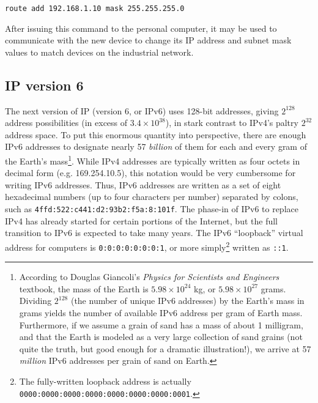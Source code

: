 \vskip 10pt

\texttt{route add 192.168.1.10 mask 255.255.255.0}

\vskip 10pt

After issuing this command to the personal computer, it may be used to communicate with the new device to change its IP address and subnet mask values to match devices on the industrial network.









\filbreak
\subsection{IP version 6}

The next version of IP (version 6, or IPv6) uses 128-bit addresses, giving $2^{128}$ address possibilities (in excess of $3.4 \times 10^{38}$), in stark contrast to IPv4's paltry $2^{32}$ address space.  To put this enormous quantity into perspective, there are enough IPv6 addresses to designate nearly 57 \textit{billion} of them for each and every gram of the Earth's mass\footnote{According to Douglas Giancoli's \textit{Physics for Scientists and Engineers} textbook, the mass of the Earth is $5.98 \times 10^{24}$ kg, or $5.98 \times 10^{27}$ grams.  Dividing $2^{128}$ (the number of unique IPv6 addresses) by the Earth's mass in grams yields the number of available IPv6 address per gram of Earth mass.  Furthermore, if we assume a grain of sand has a mass of about 1 milligram, and that the Earth is modeled as a very large collection of sand grains (not quite the truth, but good enough for a dramatic illustration!), we arrive at 57 \textit{million} IPv6 addresses per grain of sand on Earth.}.  While IPv4 addresses are typically written as four octets in decimal form (e.g. 169.254.10.5), this notation would be very cumbersome for writing IPv6 addresses.  Thus, IPv6 addresses are written as a set of eight hexadecimal numbers (up to four characters per number) separated by colons, such as \texttt{4ffd:522:c441:d2:93b2:f5a:8:101f}.  The phase-in of IPv6 to replace IPv4 has already started for certain portions of the Internet, but the full transition to IPv6 is expected to take many years.  The IPv6 ``loopback'' virtual address for computers is \texttt{0:0:0:0:0:0:0:1}, or more simply\footnote{The fully-written loopback address is actually \texttt{0000:0000:0000:0000:0000:0000:0000:0001}.} written as \texttt{::1}.  

